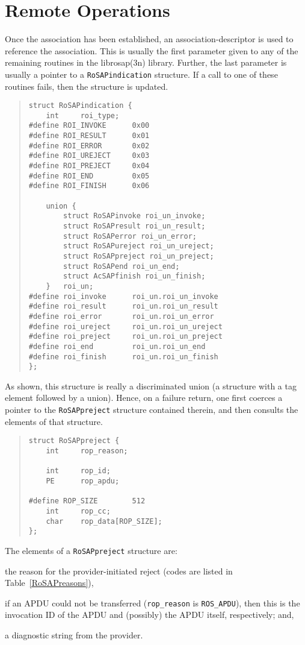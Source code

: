 \section       {Remote Operations}\label{ros:operations}
Once the association has been established,
an association-descriptor is used to reference the association.
This is usually the first parameter given to any of the remaining routines in
the \man librosap(3n) library.
Further,
the last parameter is usually a pointer to a \verb"RoSAPindication"
structure.
If a call to one of these routines fails,
then the structure is updated.
\begin{quote}\small\begin{verbatim}
struct RoSAPindication {
    int     roi_type;
#define ROI_INVOKE      0x00
#define ROI_RESULT      0x01
#define ROI_ERROR       0x02
#define ROI_UREJECT     0x03
#define ROI_PREJECT     0x04
#define ROI_END         0x05
#define ROI_FINISH      0x06

    union {
        struct RoSAPinvoke roi_un_invoke;
        struct RoSAPresult roi_un_result;
        struct RoSAPerror roi_un_error;
        struct RoSAPureject roi_un_ureject;
        struct RoSAPpreject roi_un_preject;
        struct RoSAPend roi_un_end;
        struct AcSAPfinish roi_un_finish;
    }   roi_un;
#define roi_invoke      roi_un.roi_un_invoke
#define roi_result      roi_un.roi_un_result
#define roi_error       roi_un.roi_un_error
#define roi_ureject     roi_un.roi_un_ureject
#define roi_preject     roi_un.roi_un_preject
#define roi_end         roi_un.roi_un_end
#define roi_finish      roi_un.roi_un_finish
};
\end{verbatim}\end{quote}
As shown, this structure is really a discriminated union
(a structure with a tag element followed by a union).
Hence, on a failure return,
one first coerces a pointer to the \verb"RoSAPpreject" structure contained
therein,
and then consults the elements of that structure.
\begin{quote}\small\begin{verbatim}
struct RoSAPpreject {
    int     rop_reason;

    int     rop_id;
    PE      rop_apdu;

#define ROP_SIZE        512
    int     rop_cc;
    char    rop_data[ROP_SIZE];
};
\end{verbatim}\end{quote}
The elements of a \verb"RoSAPpreject" structure are:
\begin{describe}
\item[\verb"rop\_reason":] the reason for the provider-initiated reject
(codes are listed in Table~\ref{RoSAPreasons}),

\item[\verb"rop\_id"/\verb"rop\_apdu":] if an APDU could not be transferred
(\verb"rop_reason" is \verb"ROS_APDU"), then this is the invocation ID
of the APDU and (possibly) the APDU itself, respectively;
and,

\item[\verb"rop\_data"/\verb"rop\_cc":] a diagnostic string from the provider.
\end{describe}
